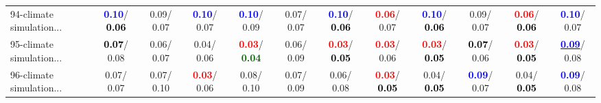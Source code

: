 \begin{table}[h]
\begin{center}
{\begin{tabular}{lc|c|c|c|c|c|c|c|c|c|c}
94-climate simulation... & \textcolor{blue}{\textbf{  0.10}}/\textcolor{black}{\textbf{  0.06}} &   0.09/  0.07 & \textcolor{blue}{\textbf{  0.10}}/  0.07 & \textcolor{blue}{\textbf{  0.10}}/  0.09 &   0.07/  0.07 & \textcolor{blue}{\textbf{  0.10}}/\textcolor{black}{\textbf{  0.06}} & \textcolor{red}{\textbf{  0.06}}/  0.07 & \textcolor{blue}{\textbf{  0.10}}/\textcolor{black}{\textbf{  0.06}} &   0.09/  0.07 & \textcolor{red}{\textbf{  0.06}}/\textcolor{black}{\textbf{  0.06}} & \textcolor{blue}{\textbf{  0.10}}/  0.07 \\
95-climate simulation... & \textcolor{black}{\textbf{  0.07}}/  0.08 &   0.06/  0.07 &   0.04/  0.06 & \textcolor{red}{\textbf{  0.03}}/\textcolor{darkgreen}{\textbf{  0.04}} &   0.06/  0.09 & \textcolor{red}{\textbf{  0.03}}/\textcolor{black}{\textbf{  0.05}} & \textcolor{red}{\textbf{  0.03}}/  0.06 & \textcolor{red}{\textbf{  0.03}}/\textcolor{black}{\textbf{  0.05}} & \textcolor{black}{\textbf{  0.07}}/  0.06 & \textcolor{red}{\textbf{  0.03}}/\textcolor{black}{\textbf{  0.05}} & \underline{\textcolor{blue}{\textbf{  0.09}}}/  0.08 \\
96-climate simulation... &   0.07/  0.07 &   0.07/  0.10 & \textcolor{red}{\textbf{  0.03}}/  0.06 &   0.08/  0.10 &   0.07/  0.09 &   0.06/  0.08 & \textcolor{red}{\textbf{  0.03}}/\textcolor{black}{\textbf{  0.05}} &   0.04/\textcolor{black}{\textbf{  0.05}} & \textcolor{blue}{\textbf{  0.09}}/  0.07 &   0.04/\textcolor{black}{\textbf{  0.05}} & \textcolor{blue}{\textbf{  0.09}}/  0.08 \\\end{tabular}}\label{stratsALCKappa2AllReduxHalfa}
\end{center}
\end{table}
